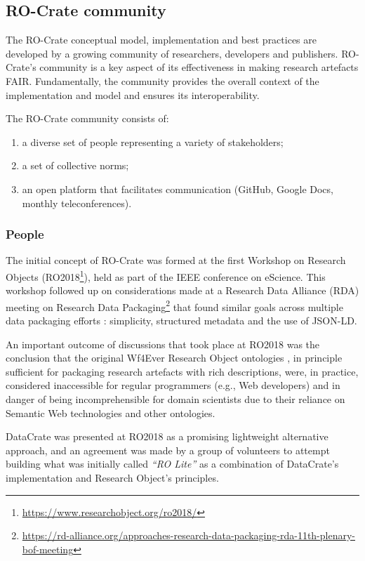 \documentclass[ds,v1.1.2,openaccess]{iosart2x}%
\begin{document}
\subsection{RO-Crate community}%

\label{sec:community}

The RO-Crate conceptual model, implementation and best practices are
developed by a growing community of researchers, developers and
publishers. RO-Crate's community is a key aspect of its effectiveness
in making research artefacts FAIR. Fundamentally, the community
provides the overall context of the implementation and model and
ensures its interoperability.

The RO-Crate community consists of:
\begin{enumerate}
\item[1.] a diverse set of people representing a variety of stakeholders;
\item[2.] a set of collective norms;
\item[3.] an open platform that facilitates communication (GitHub, Google
Docs, monthly teleconferences).
\end{enumerate}
\subsubsection{People}

The initial concept of RO-Crate was formed at the first Workshop on
Research Objects (RO2018\footnote{\url{https://www.researchobject.org/ro2018/}}),
held as part of the IEEE conference on eScience. This workshop followed
up on considerations made at a Research Data Alliance (RDA) meeting on
Research Data
Packaging\footnote{\url{https://rd-alliance.org/approaches-research-data-packaging-rda-11th-plenary-bof-meeting}}
that found similar goals across multiple data packaging efforts
\cite{doi:10.5281/zenodo.3250687}: simplicity, structured metadata and the
use of JSON-LD.

An important outcome of discussions that took place at RO2018 was the
conclusion that the original Wf4Ever Research Object ontologies
\cite{doi:10.1016/j.websem.2015.01.003}, in principle sufficient for
packaging research artefacts with rich descriptions, were, in practice,
considered inaccessible for regular programmers (e.g., Web developers)
and in danger of being incomprehensible for domain scientists due to
their reliance on Semantic Web technologies and other ontologies.

DataCrate \cite{doi:10.5281/zenodo.1445817} was presented at RO2018 as a
promising lightweight alternative approach, and an agreement was made
by a group of volunteers to attempt building what was initially called
\textit{``RO Lite''} as a combination of DataCrate's implementation and
Research Object's principles.
\end{document}

